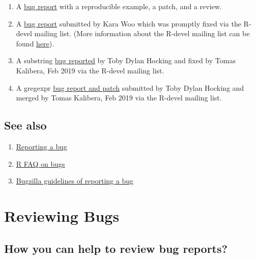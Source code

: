\documentclass[
]{book}
\begin{document}
\begin{enumerate}
\def\labelenumi{\arabic{enumi}.}
\item
  A \href{https://bugs.r-project.org/bugzilla/show_bug.cgi?id=17767}{bug report} with a reproducible example, a patch, and a review.
\item
  A \href{https://stat.ethz.ch/pipermail/r-devel/2019-May/077855.html}{bug report} submitted by Kara Woo which was promptly fixed via the R-devel mailing list. (More information about the R-devel mailing list can be found \href{https://stat.ethz.ch/mailman/listinfo/r-devel}{here}).
\item
  A substring \href{https://stat.ethz.ch/pipermail/r-devel/2019-February/077393.html}{bug reported} by Toby Dylan Hocking and fixed by Tomas Kalibera, Feb 2019 via the R-devel mailing list.
\item
  A gregexpr \href{https://stat.ethz.ch/pipermail/r-devel/2019-February/077315.html}{bug report and patch} submitted by Toby Dylan Hocking and merged by Tomas Kalibera, Feb 2019 via the R-devel mailing list.
\end{enumerate}

\hypertarget{see-also-1}{%
\section{See also}\label{see-also-1}}

\begin{enumerate}
\def\labelenumi{\arabic{enumi}.}
\item
  \href{https://www.r-project.org/bugs.html}{Reporting a bug}
\item
  \href{https://mac.r-project.org/man/R-FAQ.html\#R-Bugs}{R FAQ on bugs}
\item
  \href{https://bugs.r-project.org/bugzilla/page.cgi?id=bug-writing.html}{Bugzilla guidelines of reporting a bug}
\end{enumerate}

\hypertarget{ReviewBugs}{%
\chapter{Reviewing Bugs}\label{ReviewBugs}}

\hypertarget{how-you-can-help-to-review-bug-reports}{%
\section{How you can help to review bug reports?}\label{how-you-can-help-to-review-bug-reports}}
\end{document}
